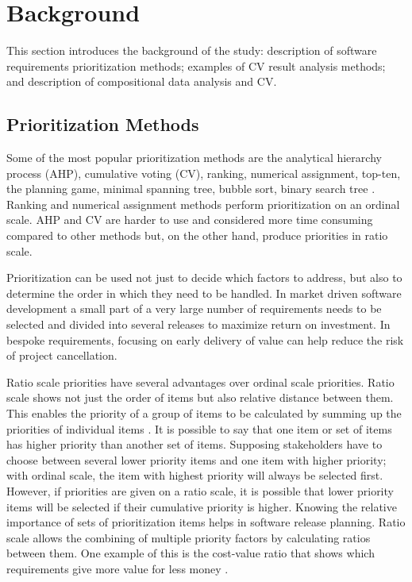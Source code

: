 \section{Background\label{background}}

\parskip -8pt
This section introduces the background of the study: description of software requirements prioritization methods; examples of CV result analysis methods; and description of compositional data analysis and CV.
\parskip 0pt

\subsection{Prioritization Methods}

\parskip -8pt
Some of the most popular prioritization methods are the analytical hierarchy
process (AHP), cumulative voting (CV), ranking, numerical assignment,
top-ten, the planning game, minimal spanning tree, bubble sort, binary
search tree \citep{Berander2005,Karlsson1998}. Ranking and numerical
assignment methods perform prioritization on an ordinal scale. AHP and CV
are harder to use and considered more time consuming compared to other methods but, 
on the other hand, produce priorities in ratio scale.
\parskip 0pt

Prioritization can be used not just to decide which factors to address,
but also to determine the order in which they need to be handled. In market
driven software development a small part of a very large number of requirements
needs to be selected and divided into several releases to maximize return
on investment. In bespoke requirements, focusing on early delivery
of value can help reduce the risk of project cancellation.

Ratio scale priorities have several advantages over ordinal scale
priorities. Ratio scale shows not just the order of items but also
relative distance between them. This enables the priority of a group of
items to be calculated by summing up the priorities of individual items
\citep{Berander2006a}. It is possible to say that one item or set
of items has higher priority than another set of items. Supposing stakeholders
have to choose between several lower priority items and one item with
higher priority; with ordinal scale, the item with highest priority will
always be selected first. However, if priorities are given on a ratio
scale, it is possible that lower priority items will be selected if
their cumulative priority is higher. Knowing the relative importance of
sets of prioritization items helps in software release planning. Ratio
scale allows the combining of multiple priority factors by calculating ratios
between them. One example of this is the cost-value ratio that shows which
requirements give more value for less money \citep{Karlsson1997}.

